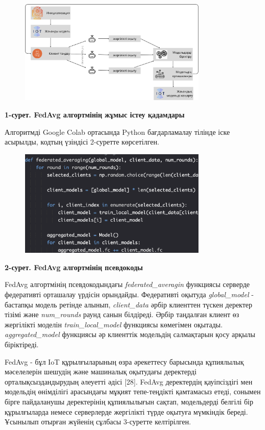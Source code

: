 \begin{figure}[H]
	\centering
	\includegraphics[width=0.8\textwidth]{assets/199}
	\caption*{}
\end{figure}

{\bfseries 1-сурет. FedAvg алгортмінің жұмыс істеу қадамдары}

Алгоритмді Google Colab ортасында Python бағдарламалау тілінде іске
асырылды, кодтың үзіндісі 2-суретте көрсетілген.

\begin{figure}[H]
	\centering
	\includegraphics[width=0.8\textwidth]{assets/200}
	\caption*{}
\end{figure}

{\bfseries 2-сурет. FedAvg алгортмінің псевдокоды}

FedAvg алгортмінің псевдокодындағы \emph{federated\_averagin} функциясы
серверде федеративті орташалау үрдісін орындайды. Федеративті оқытуда
\emph{global\_model} - бастапқы модель ретінде алынып,
\emph{client\_data} әрбір клиенттен түскен деректер тізімі және
\emph{num\_rounds} раунд санын білдіреді. Әрбір таңдалған клиент өз
жергілікті моделін \emph{train\_local\_model} функциясы көмегімен
оқытады. \emph{aggregated\_model} функциясы әр клиенттік модельдің
салмақтарын қосу арқылы біріктіреді.

FedAvg - бұл IoT құрылғыларының өзра әрекеттесу барысында құпиялылық
мәселелерін шешудің және машиналық оқытудағы деректерді
орталықсыздандырудың әлеуетті әдісі {[}28{]}. FedAvg деректердің
қауіпсіздігі мен модельдің өнімділігі арасындағы мұқият тепе-теңдікті
қамтамасыз етеді, сонымен бірге пайдаланушы деректерінің құпиялылығын
сақтап, модельдерді белгілі бір құрылғыларда немесе серверлерде
жергілікті түрде оқытуға мүмкіндік береді. Ұсынылып отырған жүйенің
сұлбасы 3-суретте келтірілген.

